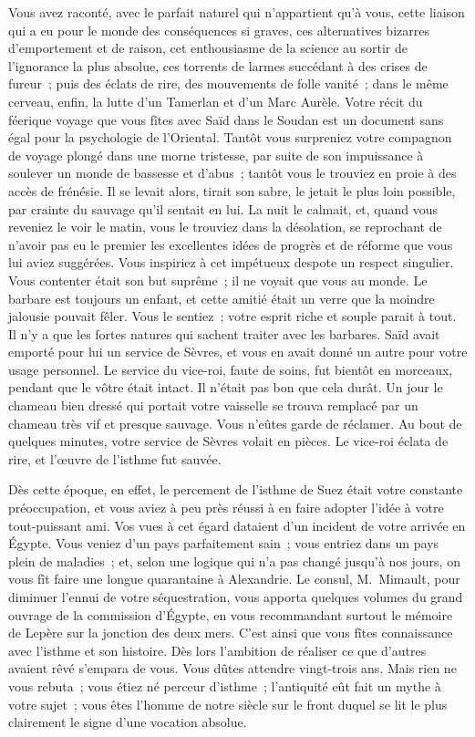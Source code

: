 \documentclass[french,twoside]{book} %
\newcommand\orgName[1]{#1}
\newcommand\persName[1]{#1}
\newcommand\placeName[1]{#1}
\begin{document}
Vous avez raconté, avec le parfait naturel qui n’appartient qu’à vous, cette liaison qui a eu pour le monde des conséquences si graves, ces alternatives bizarres d’emportement et de raison, cet enthousiasme de la science au sortir de l’ignorance la plus absolue, ces torrents de larmes succédant à des crises de fureur ; puis des éclats de rire, des mouvements de folle vanité ; dans le même cerveau, enfin, la lutte d’un {\persName Tamerlan} et d’un {\persName Marc Aurèle}. Votre récit du féerique voyage que vous fîtes avec {\persName Saïd} dans le {\placeName Soudan} est un document sans égal pour la psychologie de l’Oriental. Tantôt vous surpreniez votre compagnon de voyage plongé dans une morne tristesse, par suite de son impuissance à soulever un monde de bassesse et d’abus ; tantôt vous le trouviez en proie à des accès de frénésie. Il se levait alors, tirait son sabre, le jetait le plus loin possible, par crainte du sauvage qu’il sentait en lui. La nuit le calmait, et, quand vous reveniez le voir le matin, vous le trouviez dans la désolation, se reprochant de n’avoir pas eu le premier les excellentes idées de progrès et de réforme que vous lui aviez suggérées. Vous inspiriez à cet impétueux despote un respect singulier. Vous contenter était son but suprême ; il ne voyait que vous au monde. Le barbare est toujours un enfant, et cette amitié était un verre que la moindre jalousie pouvait fêler. Vous le sentiez ; votre esprit riche et souple parait à tout. Il n’y a que les fortes natures qui sachent traiter avec les barbares. {\persName Saïd} avait emporté pour lui un service de {\placeName Sèvres}, et vous en avait donné un autre pour votre usage personnel. Le service du vice-roi, faute de soins, fut bientôt en morceaux, pendant que le vôtre était intact. Il n’était pas bon que cela durât. Un jour le chameau bien dressé qui portait votre vaisselle se trouva remplacé par un chameau très vif et presque sauvage. Vous n’eûtes garde de réclamer. Au bout de quelques minutes, votre service de {\placeName Sèvres} volait en pièces. Le vice-roi éclata de rire, et l’œuvre de l’isthme fut sauvée.\par
Dès cette époque, en effet, le percement de l’{\placeName isthme de Suez} était votre constante préoccupation, et vous aviez à peu près réussi à en faire adopter l’idée à votre tout-puissant ami. Vos vues à cet égard dataient d’un incident de votre arrivée en {\placeName Égypte}. Vous veniez d’un pays parfaitement sain ; vous entriez dans un pays plein de maladies ; et, selon une logique qui n’a pas changé jusqu’à nos jours, on vous fît faire une longue quarantaine à {\placeName Alexandrie}. Le consul, {\persName M. Mimault}, pour diminuer l’ennui de votre séquestration, vous apporta quelques volumes du grand ouvrage de la {\orgName commission d’Égypte}, en vous recommandant surtout le mémoire de {\persName Lepère} sur la jonction des deux mers. C’est ainsi que vous fîtes connaissance avec l’isthme et son histoire. Dès lors l’ambition de réaliser ce que d’autres avaient rêvé s’empara de vous. Vous dûtes attendre vingt-trois ans. Mais rien ne vous rebuta ; vous étiez né perceur d’isthme ; l’antiquité eût fait un mythe à votre sujet ; vous êtes l’homme de notre siècle sur le front duquel se lit le plus clairement le signe d’une vocation absolue.\par
\end{document}
